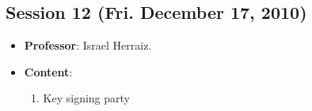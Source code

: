 \documentclass[a4paper]{article}
\begin{document}
\subsection{Session 12 (Fri. December 17, 2010)}

\begin{itemize}
 \item \textbf{Professor}: Israel Herraiz.

 \item \textbf{Content}:

 \begin{enumerate}
  \item Key signing party
 \end{enumerate}

\end{itemize}
\end{document}
